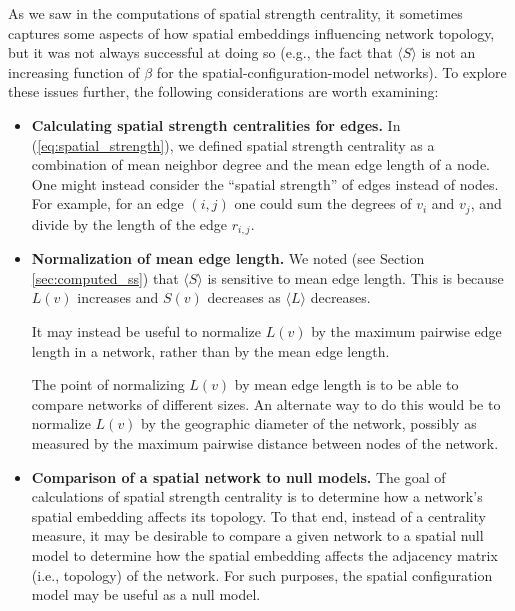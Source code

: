 \documentclass[%
 reprint,
 amsmath,amssymb,
 aps,
]{revtex4-1}
\begin{document}
As we saw in the computations of spatial strength centrality, it sometimes captures some aspects of how spatial embeddings influencing network topology, but it was not always successful at doing so (e.g., the fact that $\langle S \rangle$ is not an increasing function of $\beta$ for the spatial-configuration-model networks). To explore these issues further, the following considerations are worth examining:
\begin{itemize}
    \item{\textbf{Calculating spatial strength centralities for edges.} In (\ref{eq:spatial_strength}), we defined spatial strength centrality as a combination of mean neighbor degree and the mean edge length of a node. One might instead consider the ``spatial strength'' of edges instead of nodes. {\color{red}For example, for an edge $(i, j)$ one could sum the degrees of $v_i$ and $v_j$, and divide by the length of the edge $r_{i,j}$. }}
    \item{\textbf{Normalization of mean edge length.} We noted (see Section \ref{sec:computed_ss}) that $\langle S \rangle$ is sensitive to mean edge length. This is because $L(v)$ increases and $S(v)$ decreases as $\langle L \rangle$ decreases. 
     {\color{red}It may instead be useful to normalize $L(v)$ by the maximum pairwise edge length in a network, rather than by the mean edge length. 
     
     The point of normalizing $L(v)$ by mean edge length is to be able to compare networks of different sizes. An alternate way to do this would be to normalize $L(v)$ by the geographic diameter of the network, possibly as measured by the maximum pairwise distance between nodes of the network.}}
    \item{\textbf{Comparison of a spatial network to null models.} The goal of calculations of spatial strength centrality is to determine {\color{red}how a network's spatial embedding affects its topology}. To that end, instead of a centrality measure, it may be desirable to compare a given network to a spatial null model to determine how the spatial embedding affects the adjacency matrix (i.e., topology) of the network. For such purposes, the spatial configuration model may be useful as a null model.}
\end{itemize}
\end{document}
